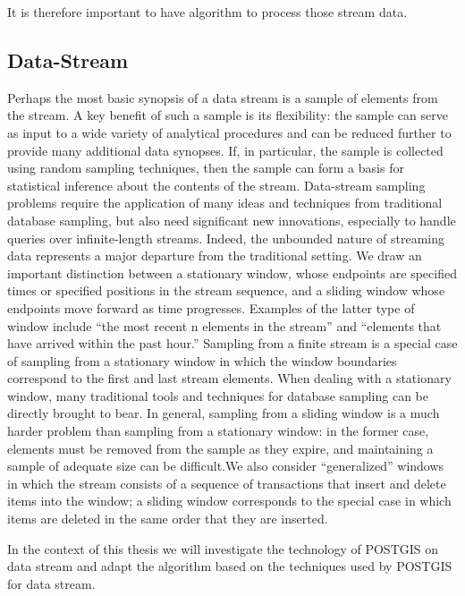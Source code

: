 \documentclass[twoside,12pt, a4paper]{report}
\begin{document}
It is therefore important to have algorithm to process those stream data.

\subsection{Data-Stream}
\cite{garofalakis2016data}
Perhaps the most basic synopsis of a data stream is a sample of elements from the
stream. A key benefit of such a sample is its flexibility: the sample can serve as input
to a wide variety of analytical procedures and can be reduced further to provide
many additional data synopses. If, in particular, the sample is collected using random
sampling techniques, then the sample can form a basis for statistical inference
about the contents of the stream. Data-stream sampling problems require the application of many ideas and techniques
from traditional database sampling, but also need significant new innovations,
especially to handle queries over infinite-length streams. Indeed, the unbounded
nature of streaming data represents a major departure from the traditional
setting. We draw an important distinction
between a stationary window, whose endpoints are specified times or specified
positions in the stream sequence, and a sliding window whose endpoints move forward
as time progresses. Examples of the latter type of window include “the most
recent n elements in the stream” and “elements that have arrived within the past
hour.” Sampling from a finite stream is a special case of sampling from a stationary
window in which the window boundaries correspond to the first and last stream
elements. When dealing with a stationary window, many traditional tools and techniques
for database sampling can be directly brought to bear. In general, sampling
from a sliding window is a much harder problem than sampling from a stationary
window: in the former case, elements must be removed from the sample as they
expire, and maintaining a sample of adequate size can be difficult.We also consider
“generalized” windows in which the stream consists of a sequence of transactions
that insert and delete items into the window; a sliding window corresponds to the
special case in which items are deleted in the same order that they are inserted.

In the context of this thesis we will investigate the technology of POSTGIS on data stream and adapt the algorithm based on the techniques used by POSTGIS for data stream. 
\end{document}
